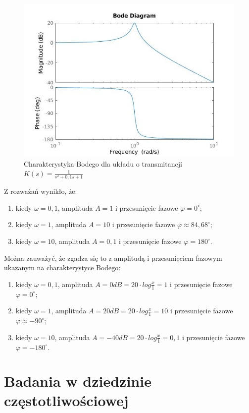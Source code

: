 \documentclass[12pt]{article}
\begin{document}
\begin{figure}[H]
    \centering
    \includegraphics[width=\textwidth]{bode.jpg}
    \caption{Charakterystyka Bodego dla układu o transmitancji $K(s) = \frac{1}{s^2+0,1s+1}$}
\end{figure}
Z rozważań wynikło, że:
\begin{enumerate}
    \item kiedy $\omega = 0,1$, amplituda $A=1$ i przesunięcie fazowe $\varphi = 0 ^\circ$;
    \item kiedy $\omega = 1$, amplituda $A=10$ i przesunięcie fazowe $\varphi \approx 84,68 ^\circ$;
    \item kiedy $\omega = 10$, amplituda $A=0,1$ i przesunięcie fazowe $\varphi = 180 ^\circ$.
\end{enumerate}
Można zauważyć, że zgadza się to z amplitudą i przesunięciem fazowym ukazanym na charakterystyce Bodego:
\begin{enumerate}
    \item kiedy $\omega = 0,1$, amplituda $A=0 dB = 20\cdot log \frac{x}{1} = 1$ i przesunięcie fazowe $\varphi = 0 ^\circ$;
    \item kiedy $\omega = 1$, amplituda $A=20dB = 20\cdot log \frac{x}{1} = 10$ i przesunięcie fazowe $\varphi \approx -90^\circ$;
    \item kiedy $\omega = 10$, amplituda $A=-40 dB = 20\cdot log \frac{x}{1} = 0,1$ i przesunięcie fazowe $\varphi = -180 ^\circ$.
\end{enumerate}


\section{Badania w dziedzinie częstotliwościowej}
\end{document}
